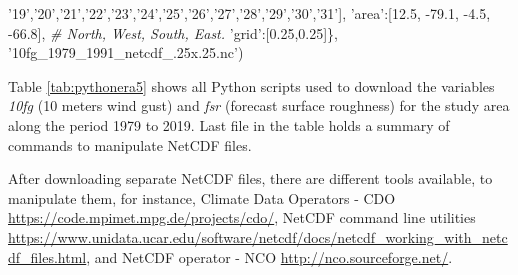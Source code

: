 \documentclass[12pt,twoside]{reedthesis}
\newenvironment{Shaded}{\begin{snugshade}}{\end{snugshade}}
\newcommand{\CommentTok}[1]{\textcolor[rgb]{0.56,0.35,0.01}{\textit{#1}}}
\newcommand{\FloatTok}[1]{\textcolor[rgb]{0.00,0.00,0.81}{#1}}
\newcommand{\NormalTok}[1]{#1}
\newcommand{\StringTok}[1]{\textcolor[rgb]{0.31,0.60,0.02}{#1}}
\begin{document}
\begin{Shaded}
\begin{Highlighting}[]
              \StringTok{'19'}\NormalTok{,}\StringTok{'20'}\NormalTok{,}\StringTok{'21'}\NormalTok{,}\StringTok{'22'}\NormalTok{,}\StringTok{'23'}\NormalTok{,}\StringTok{'24'}\NormalTok{,}\StringTok{'25'}\NormalTok{,}\StringTok{'26'}\NormalTok{,}\StringTok{'27'}\NormalTok{,}\StringTok{'28'}\NormalTok{,}\StringTok{'29'}\NormalTok{,}\StringTok{'30'}\NormalTok{,}\StringTok{'31'}\NormalTok{],}
       \StringTok{'area'}\NormalTok{:[}\FloatTok{12.5}\NormalTok{, }\FloatTok{-79.1}\NormalTok{, }\FloatTok{-4.5}\NormalTok{, }\FloatTok{-66.8}\NormalTok{], }\CommentTok{# North, West, South, East.}
       \StringTok{'grid'}\NormalTok{:[}\FloatTok{0.25}\NormalTok{,}\FloatTok{0.25}\NormalTok{]\},}
      \StringTok{'10fg_1979_1991_netcdf_.25x.25.nc'}\NormalTok{)}
\end{Highlighting}
\end{Shaded}
\normalsize

Table \ref{tab:pythonera5} shows all Python scripts used to download the variables \emph{10fg} (10 meters wind gust) and \emph{fsr} (forecast surface roughness) for the study area along the period 1979 to 2019. Last file in the table holds a summary of commands to manipulate NetCDF files.

After downloading separate NetCDF files, there are different tools available, to manipulate them, for instance, Climate Data Operators - CDO \url{https://code.mpimet.mpg.de/projects/cdo/}, NetCDF command line utilities \url{https://www.unidata.ucar.edu/software/netcdf/docs/netcdf_working_with_netcdf_files.html}, and NetCDF operator - NCO \url{http://nco.sourceforge.net/}.
\end{document}
